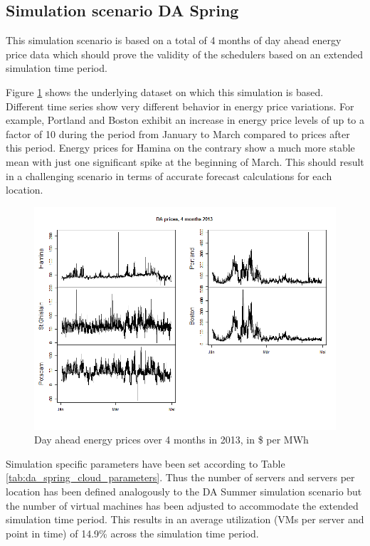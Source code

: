 \subsection{Simulation scenario DA Spring} \label{ssec:simulation_scenario_da_spring}

This simulation scenario is based on a total of 4 months of day ahead energy price data which should prove the validity of the schedulers based on an extended simulation time period. 

Figure \ref{fig:da_sim_2013_4months} shows the underlying dataset on which this simulation is based. 
Different time series show very different behavior in energy price variations. For example, Portland and Boston exhibit an increase in energy price levels of up to a factor of 10 during the period from January to March compared to prices after this period. Energy prices for Hamina on the contrary show a much more stable mean with just one significant spike at the beginning of March. This should result in a challenging scenario in terms of accurate forecast calculations for each location. 



\begin{figure}[htbp]
	\centering
		\includegraphics[width=1.0\textwidth]{figures/evaluation_and_results/da_sim_2013_4months.png}
	\caption{Day ahead energy prices over 4 months in 2013, in \$ per MWh}
	\label{fig:da_sim_2013_4months}
\end{figure}

Simulation specific parameters have been set according to Table \ref{tab:da_spring_cloud_parameters}. Thus the number of servers and servers per location has been defined analogously to the DA Summer simulation scenario but the number of virtual machines has been adjusted to accommodate the extended simulation time period. This results in an average utilization (VMs per server and point in time) of 14.9\% across the simulation time period. 

